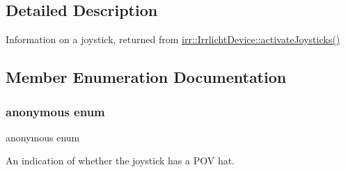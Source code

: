 \subsection{Detailed Description}
Information on a joystick, returned from \hyperlink{classirr_1_1IrrlichtDevice_af06f8d2c4fdffd1f879e46685bcbc6e3}{irr\+::\+Irrlicht\+Device\+::activate\+Joysticks()} 

\subsection{Member Enumeration Documentation}
\mbox{\label{structirr_1_1SJoystickInfo_ad6a9e7ef00b0d259a7c90bb3778cd615}} 
\subsubsection{\texorpdfstring{anonymous enum}{anonymous enum}}
{\footnotesize\ttfamily anonymous enum}



An indication of whether the joystick has a P\+OV hat. 

